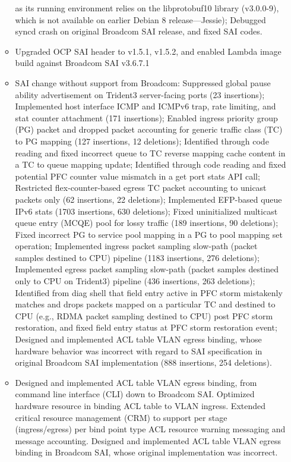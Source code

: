 \documentclass[letterpaper,11pt]{article}
\newcommand{\resitem}[1]{\item #1 \vspace{-2pt}}
\begin{document}
\begin{itemize}
\begin{itemize}
{  as its running environment relies on the libprotobuf10 library (v3.0.0-9), which is not available on earlier Debian 8 release---Jessie);
  Debugged syncd crash on original Broadcom SAI release, and fixed SAI codes.}
  \resitem{Upgraded OCP SAI header to v1.5.1, v1.5.2, and enabled Lambda image build against Broadcom SAI v3.6.7.1}
  \resitem{SAI change without support from Broadcom: Suppressed global pause ability advertisement on Trident3 server-facing ports (23 insertions);
  Implemented host interface ICMP and ICMPv6 trap, rate limiting, and stat counter attachment (171 insertions);
  Enabled ingress priority group (PG) packet and dropped packet accounting for generic traffic class (TC) to PG mapping (127 insertions, 12 deletions);
  Identified through code reading and fixed incorrect queue to TC reverse mapping cache content in a TC to queue mapping update;
  Identified through code reading and fixed potential PFC counter value mismatch in a get port stats API call;
  Restricted flex-counter-based egress TC packet accounting to unicast packets only (62 insertions, 22 deletions);
  Implemented EFP-based queue IPv6 stats (1703 insertions, 630 deletions);
  Fixed uninitialized multicast queue entry (MCQE) pool for lossy traffic (189 insertions, 90 deletions);
  Fixed incorrect PG to service pool mapping in a PG to pool mapping set operation;
  Implemented ingress packet sampling slow-path (packet samples destined to CPU) pipeline (1183 insertions, 276 deletions);
  Implemented egress packet sampling slow-path (packet samples destined only to CPU on Trident3) pipeline (436 insertions, 263 deletions);
  Identified from diag shell that field entry active in PFC storm mistakenly matches and drops packets
  mapped on a particular TC and destined to CPU (e.g., RDMA packet sampling destined to CPU) post PFC storm restoration,
  and fixed field entry status at PFC storm restoration event;
  Designed and implemented ACL table VLAN egress binding, whose hardware behavior was incorrect
  with regard to SAI specification in original Broadcom SAI implementation (888 insertions, 254 deletions).
  }
  \resitem{Designed and implemented ACL table VLAN egress binding, from command line interface (CLI) down to Broadcom SAI.
  Optimized hardware resource in binding ACL table to VLAN ingress.
  Extended critical resource management (CRM) to support per stage (ingress/egress) per bind point type
  ACL resource warning messaging and message accounting.
  Designed and implemented ACL table VLAN egress binding in Broadcom SAI, whose original implementation was incorrect.
}
\end{itemize}
\end{itemize}
\end{document}
